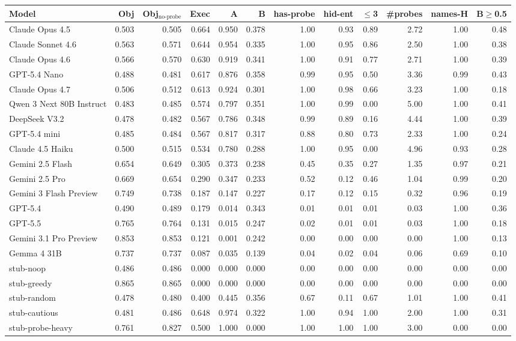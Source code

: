\begin{tabular}{lrrrrrrrrrrr}
\toprule
Model & Obj & Obj$_{\text{no-probe}}$ & Exec & A & B & has-probe & hid-ent & $\le$3 & \#probes & names-H & B$\geq$0.5 \\
\midrule
Claude Opus 4.5 & 0.503 & 0.505 & 0.664 & 0.950 & 0.378 & 1.00 & 0.93 & 0.89 & 2.72 & 1.00 & 0.48 \\
Claude Sonnet 4.6 & 0.563 & 0.571 & 0.644 & 0.954 & 0.335 & 1.00 & 0.95 & 0.86 & 2.50 & 1.00 & 0.38 \\
Claude Opus 4.6 & 0.566 & 0.570 & 0.630 & 0.919 & 0.341 & 1.00 & 0.91 & 0.77 & 2.71 & 1.00 & 0.39 \\
GPT-5.4 Nano & 0.488 & 0.481 & 0.617 & 0.876 & 0.358 & 0.99 & 0.95 & 0.50 & 3.36 & 0.99 & 0.43 \\
Claude Opus 4.7 & 0.506 & 0.512 & 0.613 & 0.924 & 0.301 & 1.00 & 0.98 & 0.66 & 3.23 & 1.00 & 0.18 \\
Qwen 3 Next 80B Instruct & 0.483 & 0.485 & 0.574 & 0.797 & 0.351 & 1.00 & 0.99 & 0.00 & 5.00 & 1.00 & 0.41 \\
DeepSeek V3.2 & 0.478 & 0.482 & 0.567 & 0.786 & 0.348 & 0.99 & 0.89 & 0.16 & 4.44 & 1.00 & 0.39 \\
GPT-5.4 mini & 0.485 & 0.484 & 0.567 & 0.817 & 0.317 & 0.88 & 0.80 & 0.73 & 2.33 & 1.00 & 0.24 \\
Claude 4.5 Haiku & 0.500 & 0.515 & 0.534 & 0.780 & 0.288 & 1.00 & 0.95 & 0.00 & 4.96 & 0.93 & 0.28 \\
Gemini 2.5 Flash & 0.654 & 0.649 & 0.305 & 0.373 & 0.238 & 0.45 & 0.35 & 0.27 & 1.35 & 0.97 & 0.21 \\
Gemini 2.5 Pro & 0.669 & 0.654 & 0.290 & 0.347 & 0.233 & 0.52 & 0.12 & 0.46 & 1.04 & 0.99 & 0.20 \\
Gemini 3 Flash Preview & 0.749 & 0.738 & 0.187 & 0.147 & 0.227 & 0.17 & 0.12 & 0.15 & 0.32 & 0.96 & 0.19 \\
GPT-5.4 & 0.490 & 0.489 & 0.179 & 0.014 & 0.343 & 0.01 & 0.01 & 0.01 & 0.03 & 1.00 & 0.36 \\
GPT-5.5 & 0.765 & 0.764 & 0.131 & 0.015 & 0.247 & 0.02 & 0.01 & 0.01 & 0.03 & 1.00 & 0.18 \\
Gemini 3.1 Pro Preview & 0.853 & 0.853 & 0.121 & 0.001 & 0.242 & 0.00 & 0.00 & 0.00 & 0.00 & 1.00 & 0.13 \\
Gemma 4 31B & 0.737 & 0.737 & 0.087 & 0.035 & 0.139 & 0.04 & 0.02 & 0.04 & 0.06 & 0.69 & 0.10 \\
stub-noop & 0.486 & 0.486 & 0.000 & 0.000 & 0.000 & 0.00 & 0.00 & 0.00 & 0.00 & 0.00 & 0.00 \\
stub-greedy & 0.865 & 0.865 & 0.000 & 0.000 & 0.000 & 0.00 & 0.00 & 0.00 & 0.00 & 0.00 & 0.00 \\
stub-random & 0.478 & 0.480 & 0.400 & 0.445 & 0.356 & 0.67 & 0.11 & 0.67 & 1.01 & 1.00 & 0.41 \\
stub-cautious & 0.481 & 0.486 & 0.648 & 0.974 & 0.322 & 1.00 & 0.94 & 1.00 & 2.00 & 1.00 & 0.31 \\
stub-probe-heavy & 0.761 & 0.827 & 0.500 & 1.000 & 0.000 & 1.00 & 1.00 & 1.00 & 3.00 & 0.00 & 0.00 \\
\bottomrule
\end{tabular}

